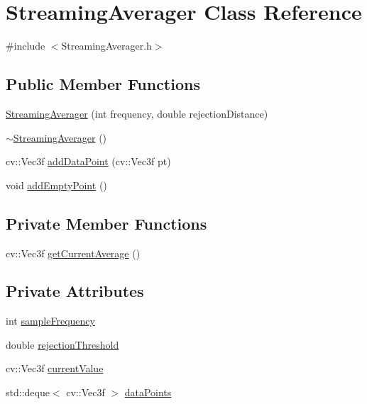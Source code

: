 \hypertarget{class_streaming_averager}{}\section{Streaming\+Averager Class Reference}
\label{class_streaming_averager}


{\ttfamily \#include $<$Streaming\+Averager.\+h$>$}

\subsection*{Public Member Functions}
\begin{DoxyCompactItemize}
\item 
\hyperlink{class_streaming_averager_a10619c9e194b1214153fcdf9c393136c}{Streaming\+Averager} (int frequency, double rejection\+Distance)
\item 
\hyperlink{class_streaming_averager_a1b792331aa3d870fbddb7e50b18db35e}{$\sim$\+Streaming\+Averager} ()
\item 
cv\+::\+Vec3f \hyperlink{class_streaming_averager_a238462f19f093dbb109cb91128d0d2f7}{add\+Data\+Point} (cv\+::\+Vec3f pt)
\item 
void \hyperlink{class_streaming_averager_a54346cb327b6d405181a7347efa086ed}{add\+Empty\+Point} ()
\end{DoxyCompactItemize}
\subsection*{Private Member Functions}
\begin{DoxyCompactItemize}
\item 
cv\+::\+Vec3f \hyperlink{class_streaming_averager_a2388115084de5ec238c5a5b47bf20dc8}{get\+Current\+Average} ()
\end{DoxyCompactItemize}
\subsection*{Private Attributes}
\begin{DoxyCompactItemize}
\item 
int \hyperlink{class_streaming_averager_a4fa6f781e59a8b979da834e098fb262e}{sample\+Frequency}
\item 
double \hyperlink{class_streaming_averager_a861d5b10b9cc18d8a94b070af1fd49e0}{rejection\+Threshold}
\item 
cv\+::\+Vec3f \hyperlink{class_streaming_averager_a3a0923d6e95a69817321367b98aa9bf5}{current\+Value}
\item 
std\+::deque$<$ cv\+::\+Vec3f $>$ \hyperlink{class_streaming_averager_aade55d0df31cc9652faf1fe4f7f2887c}{data\+Points}
\end{DoxyCompactItemize}


